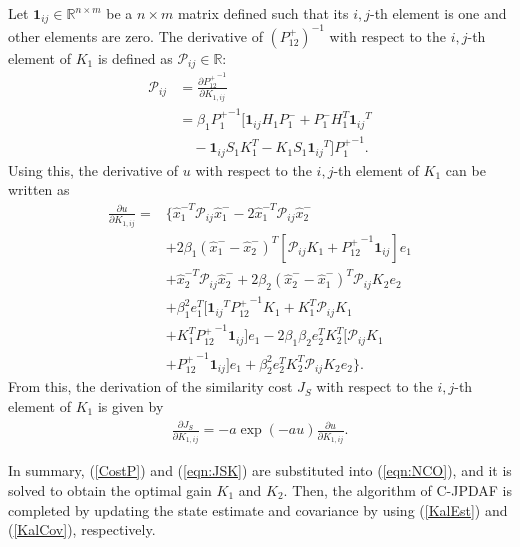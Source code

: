 \documentclass[letterpaper, 10pt, conference]{ieeeconf}
\newcommand{\refeqn}[1]{(\ref{eqn:#1})}
\renewcommand{\Re}{\ensuremath{\mathbb{R}}}
\begin{document}

\newcommand{\Iij}{\ensuremath{\mathbf{1}_{ij}}}

Let $\Iij\in \Re^{n\times m}$ be a $n\times m$ matrix defined such that its $i,j$-th element is one and other elements are zero. The derivative of $(P_{12}^+)^{-1}$ with respect to the $i,j$-th element of $K_1$ is defined as $\mathcal{P}_{ij}\in\Re$:
\begin{align}
\mathcal{P}_{ij}&=\frac{\partial {P^+_{12}}^{-1}}{\partial K_{1,ij}}\nonumber\\
&=\beta_1{P_1^+}^{-1}[\Iij H_1P_1^-+P_1^-H_1^T\Iij^T\nonumber\\
&\quad -\Iij S_1K_1^T -K_1S_1\Iij^T]{P_1^+}^{-1}.
\end{align}
Using this, the derivative of $u$ with respect to the $i,j$-th element of $K_1$ can be written as
\begin{align}
\frac{\partial u}{\partial K_{1,ij}}%
=& \{\hat x_1^{-T}\mathcal{P}_{ij}\hat x_1^-
-2\hat x_1^{-T}\mathcal{P}_{ij}\hat x_2^-\nonumber\\
&+2\beta_1(\hat x_1^{-}-\hat x_2^{-})^T[\mathcal{P}_{ij}K_1+{P^+_{12}}^{-1}\Iij]e_1\nonumber\\
&+\hat x_2^{-T}\mathcal{P}_{ij}\hat x_2^-+2\beta_2(\hat x_2^{-}-\hat x_1^{-})^T\mathcal{P}_{ij}K_2e_2\nonumber\\
&+\beta_1^2e_1^T[\Iij^T{P^+_{12}}^{-1}K_1+K_1^T\mathcal{P}_{ij}K_1\nonumber\\
&+K_1^T{P^+_{12}}^{-1}\Iij]e_1-2\beta_1\beta_2e_2^TK_2^T[\mathcal{P}_{ij}K_1\nonumber\\
&+{P^+_{12}}^{-1}\Iij]e_1+\beta_2^2e_2^TK_2^T\mathcal{P}_{ij}K_2e_2\}.
\end{align}
From this, the derivation of the similarity cost $J_S$ with respect to the $i,j$-th element of $K_1$ is given by
\begin{align}
\frac{\partial J_{S}}{\partial K_{1,ij}}=-a\exp(-au)\frac{\partial u}{\partial K_{1,ij}}.\label{eqn:JSK}
\end{align}

In summary, (\ref{CostP}) and \refeqn{JSK} are substituted into \refeqn{NCO}, and it is solved to obtain the optimal gain $K_1$ and $K_2$. Then, the algorithm of C-JPDAF is completed by updating the state estimate and covariance by using (\ref{KalEst}) and (\ref{KalCov}), respectively. 
\end{document}
